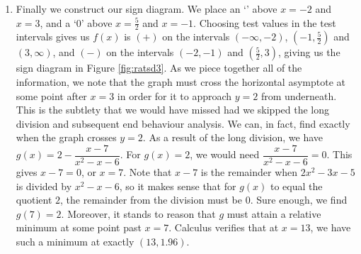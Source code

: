 {\begin{enumerate}
\begin{itemize}
\item  \textit{The behaviour of $y=g(x)$ as $x \rightarrow \infty$.}  To consider $\dfrac{x-7}{x^2-x-6}$ as $x \rightarrow \infty$, we imagine substituting $x = \mbox{$1$ billion}$ and, going through the usual mental routine, find \[\dfrac{x-7}{x^2-x-6} \approx \mbox{very small $(+)$}\]  Hence, $g(x) \approx 2 - \ \mbox{very small $(+)$}$, in other words, the graph of $y=g(x)$ is just \textit{below} the line $y=2$ as $x \rightarrow \infty$.

\end{itemize}

Our end behaviour (again, without labels on the $x$-axis) is given in Figure \ref{fig:ratgraph6}.



\item  Finally we construct our sign diagram.  We place an `\textinterrobang' above $x=-2$ and $x=3$, and a `$0$' above $x = \frac{5}{2}$ and $x=-1$.  Choosing test values in the test intervals gives us $f(x)$ is $(+)$ on the intervals $(-\infty, -2)$, $\left(-1, \frac{5}{2}\right)$ and $(3, \infty)$, and $(-)$ on the intervals $(-2,-1)$ and $\left(\frac{5}{2}, 3\right)$, giving us the sign diagram in Figure \ref{fig:ratsd3}.  As we piece together all of the information, we note that the graph must cross the horizontal asymptote at some point after $x=3$ in order for it to approach $y=2$ from underneath.  This is the subtlety that we would have missed had we skipped the long division and subsequent end behaviour analysis.  We can, in fact, find exactly when the graph crosses $y=2$.  As a result of the long division, we have $g(x) =  2 - \dfrac{x-7}{x^2-x-6}$.  For $g(x) = 2$, we would need $\dfrac{x-7}{x^2-x-6} = 0$. This gives $x-7= 0$, or $x=7$.  Note that $x-7$ is the remainder when $2x^2-3x-5$ is divided by $x^2-x-6$, so it makes sense that for $g(x)$ to equal the quotient $2$, the remainder from the division must be $0$.  Sure enough, we find $g(7)=2$.  Moreover, it stands to reason that $g$ must attain a relative minimum at some point past $x=7$.  Calculus verifies that at $x=13$, we have such a minimum at exactly $(13, 1.96)$.  





\end{enumerate}
}

